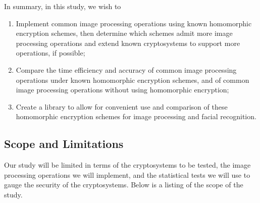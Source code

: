 In summary, in this study, we wish to
\begin{enumerate}
    \item Implement common image processing operations using known homomorphic encryption schemes, then determine which schemes admit more image processing operations and extend known cryptosystems to support more operations, if possible;
    \item Compare the time efficiency and accuracy of common image processing operations under known homomorphic encryption schemes, and of common image processing operations without using homomorphic encryption;
    \item Create a library to allow for convenient use and comparison of these homomorphic encryption schemes for image processing and facial recognition.
\end{enumerate}

\subsection{Scope and Limitations}
Our study will be limited in terms of the cryptosystems to be tested, the image processing operations we will implement, and the statistical tests we will use to gauge the security of the cryptosystems. Below is a listing of the scope of the study.

